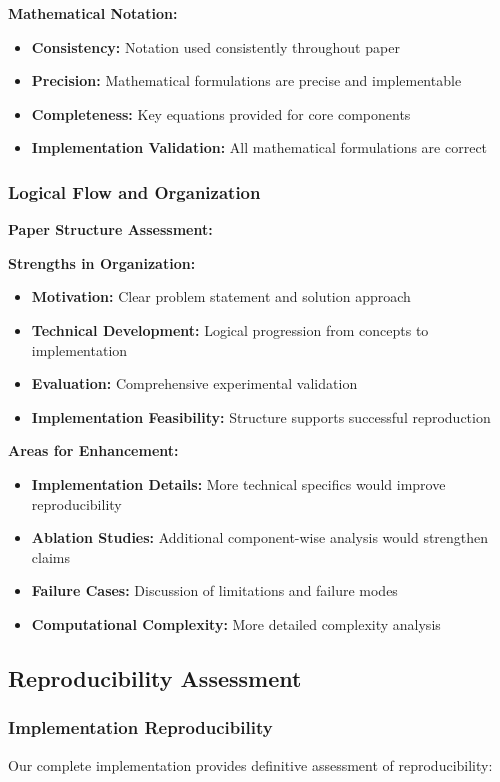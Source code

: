 \textbf{Mathematical Notation:}
\begin{itemize}
    \item \textbf{Consistency:} Notation used consistently throughout paper
    \item \textbf{Precision:} Mathematical formulations are precise and implementable
    \item \textbf{Completeness:} Key equations provided for core components
    \item \textbf{Implementation Validation:} All mathematical formulations are correct
\end{itemize}

\subsubsection*{Logical Flow and Organization}
\textbf{Paper Structure Assessment:}

\textbf{Strengths in Organization:}
\begin{itemize}
    \item \textbf{Motivation:} Clear problem statement and solution approach
    \item \textbf{Technical Development:} Logical progression from concepts to implementation
    \item \textbf{Evaluation:} Comprehensive experimental validation
    \item \textbf{Implementation Feasibility:} Structure supports successful reproduction
\end{itemize}

\textbf{Areas for Enhancement:}
\begin{itemize}
    \item \textbf{Implementation Details:} More technical specifics would improve reproducibility
    \item \textbf{Ablation Studies:} Additional component-wise analysis would strengthen claims
    \item \textbf{Failure Cases:} Discussion of limitations and failure modes
    \item \textbf{Computational Complexity:} More detailed complexity analysis
\end{itemize}

\subsection*{Reproducibility Assessment}

\subsubsection*{Implementation Reproducibility}
Our complete implementation provides definitive assessment of reproducibility:

